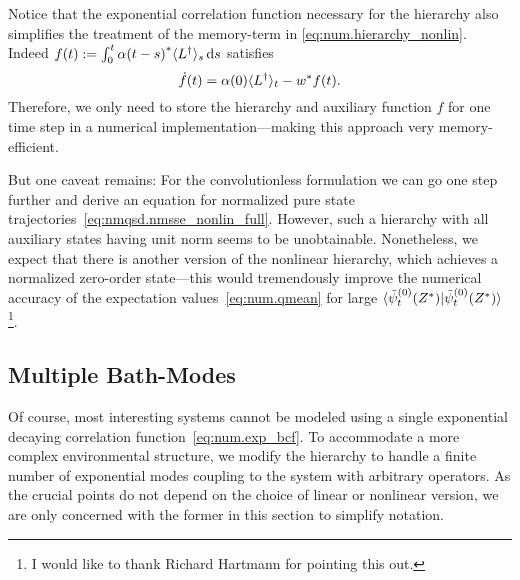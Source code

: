 Notice that the exponential correlation function necessary for the hierarchy also simplifies the treatment of the memory-term in \autoref{eq:num.hierarchy_nonlin}.
Indeed $f(t) := \int_0^t {\alpha(t-s)}^* \langle L^\dagger \rangle_s \, \mathrm{d} s$ satisfies
\begin{equation}
  \dot f(t) = \alpha(0) \langle L^\dagger \rangle_t - {w}^* f(t).
  \label{eq:num.memory_term}
\end{equation}
Therefore, we only need to store the hierarchy and auxiliary function $f$ for one time step in a numerical implementation---making this approach very memory-efficient.

But one caveat remains: For the convolutionless formulation we can go one step further and derive an equation for normalized pure state trajectories~\ref{eq:nmqsd.nmsse_nonlin_full}.
However, such a hierarchy with all auxiliary states having unit norm seems to be unobtainable.
Nonetheless, we expect that there is another version of the nonlinear hierarchy, which achieves a normalized zero-order state---this would tremendously improve the numerical accuracy of the expectation values~\ref{eq:num.qmean} for large $\langle \tilde\psi_t^{(0)}({Z}^*) | \tilde\psi_t^{(0)}({Z}^*) \rangle$\footnote{%
  I would like to thank Richard Hartmann for pointing this out.
}.



\subsection{Multiple Bath-Modes}
\label{sub:num.sheom.nonlin}

Of course, most interesting systems cannot be modeled using a single exponential decaying correlation function~\ref{eq:num.exp_bcf}.
To accommodate a more complex environmental structure, we modify the hierarchy to handle a finite number of exponential modes coupling to the system with arbitrary operators.
As the crucial points do not depend on the choice of linear or nonlinear version, we are only concerned with the former in this section to simplify notation.

